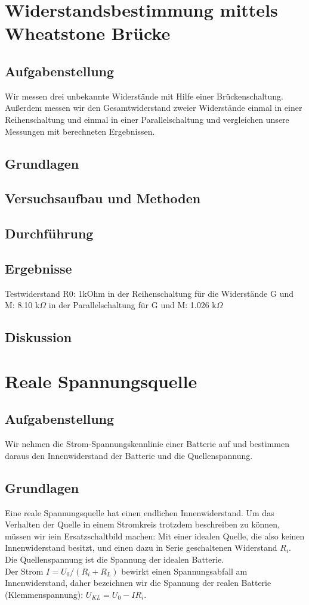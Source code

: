 \documentclass{article}
\begin{document}
\section{Widerstandsbestimmung mittels Wheatstone Brücke}

\subsection{Aufgabenstellung}
Wir messen drei unbekannte Widerstände mit Hilfe einer Brückenschaltung.
Außerdem messen wir den Gesamtwiderstand zweier Widerstände einmal in einer Reihenschaltung und einmal in einer Parallelschaltung und vergleichen unsere Messungen mit berechneten Ergebnissen.
\subsection{Grundlagen}
\subsection{Versuchsaufbau und Methoden}
\subsection{Durchführung}
\subsection{Ergebnisse}

Testwiderstand R0: 1kOhm
in der Reihenschaltung für die Widerstände G und M: 8.10 k$\Omega$
in der Parallelschaltung für G und M: 1.026 k$\Omega$
\subsection{Diskussion}

\section{Reale Spannungsquelle}

\subsection{Aufgabenstellung}
Wir nehmen die Strom-Spannungskennlinie einer Batterie auf und bestimmen daraus den Innenwiderstand der Batterie und die Quellenspannung.


\subsection{Grundlagen}
Eine reale Spannungsquelle hat einen endlichen Innenwiderstand. Um das Verhalten der Quelle in einem Stromkreis trotzdem beschreiben zu können, müssen wir iein Ersatzschaltbild machen: Mit einer idealen Quelle, die also keinen Innenwiderstand besitzt, und einen dazu in Serie geschaltenen Widerstand $R_i$.\\
Die Quellenspannung ist die Spannung der idealen Batterie.\\
Der Strom $I=U_0/(R_i+R_L)$ bewirkt einen Spannungsabfall am Innenwiderstand, daher bezeichnen wir die Spannung der realen Batterie (Klemmenspannung): $U_{KL}=U_0-IR_i$.
\end{document}
